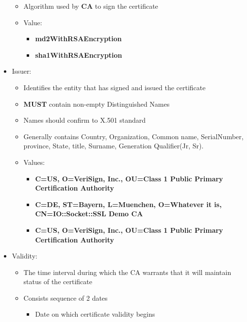 \documentclass[12pt]{report}
\begin{document}
\begin{itemize}
\begin{itemize}
                    \item Algorithm used by \textbf{CA} to sign the certificate
                    \item Value:
                        \begin{itemize}
                            \item \textbf{md2WithRSAEncryption}
                            \item \textbf{sha1WithRSAEncryption}
                        \end{itemize}
                \end{itemize}
            \item Issuer:
                \begin{itemize}
                    \item Identifies the entity that has signed and issued the certificate
                    \item \textbf{MUST} contain non-empty Distinguished Names
                    \item Names should confirm to X.501 standard
                    \item Generally contains Country, Organization, Common name, SerialNumber,
                        province, State, title, Surname, Generation Qualifier(Jr, Sr).
                    \item Values:
                    \begin{itemize}
                        \item \textbf{C=US, O=VeriSign, Inc., OU=Class 1 Public Primary Certification Authority}
                        \item \textbf{C=DE, ST=Bayern, L=Muenchen, O=Whatever it is, CN=IO::Socket::SSL Demo CA}
                        \item \textbf{C=US, O=VeriSign, Inc., OU=Class 1 Public Primary Certification Authority}
                    \end{itemize}
                \end{itemize}
            \item Validity:
                \begin{itemize}
                    \item The time interval during which the CA warrants that it will maintain status of the certificate
                    \item Consists sequence of 2 dates
                        \begin{itemize}
                            \item Date on which certificate validity begins

\end{itemize}
\end{itemize}
\end{itemize}
\end{document}
